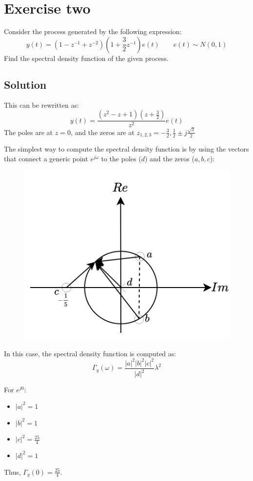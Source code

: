 \section{Exercise two}

Consider the process generated by the following expression:
\[y(t)=\left( 1-z^{-1}+z^{-2} \right)\left( 1+\dfrac{3}{2}z^{-1}\right)e(t)\qquad e(t)\sim N(0,1)\]
Find the spectral density function of the given process.

\subsection*{Solution}
This can be rewritten as:
\[y(t)=\dfrac{\left(z^2-z+1\right)\left( z+\frac{3}{2} \right)}{z^2}e(t)\]
The poles are at $z=0$, and the zeros are at $z_{1,2,3}=-\frac{3}{2},\frac{1}{2}\pm j\frac{\sqrt{3}}{2}$

The simplest way to compute the spectral density function is by using the vectors that connect a generic point $e^{j\omega}$ to the poles ($d$) and the zeros ($a,b,c$):
\begin{figure}[H]
    \centering
    \includegraphics[width=0.5\linewidth]{images/spec1.png}
\end{figure}
In this case, the spectral density function is computed as:
\[\Gamma_y(\omega)=\dfrac{\left\lvert a \right\rvert^2\left\lvert b \right\rvert^2\left\lvert c \right\rvert^2}{\left\lvert d \right\rvert^2}\lambda^2\]

For $e^{j0}$:
\begin{itemize}
    \item $\left\lvert a \right\rvert^2=1$
    \item $\left\lvert b \right\rvert^2=1$
    \item $\left\lvert c \right\rvert^2=\frac{25}{4}$
    \item $\left\lvert d \right\rvert^2=1$
\end{itemize}
Thus, $\Gamma_y(0)=\frac{25}{4}$.

